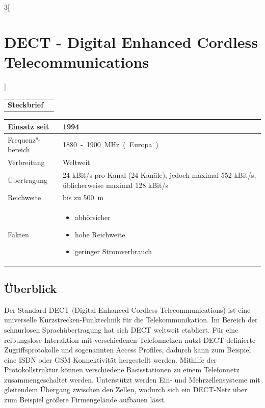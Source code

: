 \begin{multicols}{3}[\section{DECT - Digital Enhanced Cordless Telecommunications}]


\newrefsegment

\begin{boxedminipage}{\linewidth}
\begin{tabular}{p{}p{2.7 cm}}
\textbf{Steckbrief}& \\
\end{tabular}
\begin{tabular}{p{}|p{2.7 cm}}
      Einsatz seit & 1994\\
      \hline
      Frequenz"-bereich  & \SI{1880}-\SI{1900}{\mega\hertz} (Europa)\\
      \hline
      Verbreitung & Weltweit\\
      \hline
      Übertragung & 24 kBit/s pro Kanal (24 Kanäle), jedoch maximal 552 kBit/s, üblicherweise maximal 128 kBit/s\\
      \hline
      Reichweite & bis zu \SI{500}{\meter}\\
      \hline
      Fakten & \begin{itemize}
			\item abhörsicher
			\item hohe Reichweite
			\item geringer Stromverbrauch
		\end{itemize}
				\\
\end{tabular}
\end{boxedminipage}
\par
\subsection*{Überblick}
Der Standard DECT (Digital Enhanced Cordless Telecommunications) ist eine universelle Kurzstrecken-Funktechnik für die Telekommunikation. Im Bereich der schnurlosen Sprachübertragung hat sich DECT weltweit etabliert.
Für eine reibungslose Interaktion mit verschiedenen Telefonnetzen nutzt DECT definierte Zugriffsprotokolle und sogenannten Access Profiles, dadurch kann zum Beispiel eine ISDN oder GSM Konnektivität hergestellt werden. 
Mithilfe der Protokollstruktur können verschiedene Basisstationen zu einem Telefonnetz zusammengeschaltet werden. Unterstützt werden Ein- und Mehrzellensysteme mit gleitendem Übergang zwischen den Zellen, wodurch sich ein DECT-Netz über zum Beispiel größere Firmengelände aufbauen lässt.
\cite{dect.1}

\end{multicols}
